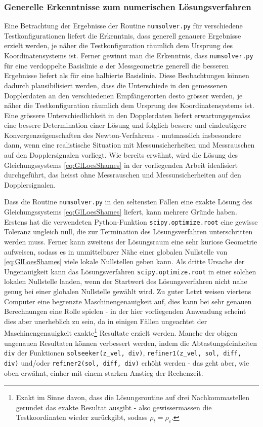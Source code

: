 \documentclass[a4paper,12pt]{article}
\numberwithin{equation}{section}
\begin{document}
\subsubsection{Generelle Erkenntnisse zum numerischen Lösungsverfahren}
Eine Betrachtung der Ergebnisse der Routine \verb|numsolver.py| für verschiedene Testkonfigurationen liefert die Erkenntnis, dass generell genauere Ergebnisse erzielt werden, je näher die Testkonfiguration räumlich dem Ursprung des Koordinatensystems ist. Ferner gewinnt man die Erkenntnis, dass \verb|numsolver.py| für eine verdoppelte Basislinie $a$ der Messgeometrie generell die besseren Ergebnisse liefert als für eine halbierte Basislinie. Diese Beobachtungen können dadurch plausibilisiert werden, dass die Unterschiede in den gemessenen Dopplerdaten an den verschiedenen Empfängerorten desto grösser werden, je näher die Testkonfiguration räumlich dem Ursprung des Koordinatensystems ist. Eine grössere Unterschiedlichkeit in den Dopplerdaten liefert erwartungsgemäss eine bessere Determination einer Lösung und folglich bessere und eindeutigere Konvergenzeigenschaften des Newton-Verfahrens - mutmasslich insbesondere dann, wenn eine realistische Situation mit Messunsicherheiten und Messrauschen auf den Dopplersignalen vorliegt. Wie bereits erwähnt, wird die Lösung des Gleichungssystems \eqref{eq:GlLoesShames} in der vorliegenden Arbeit idealisiert durchgeführt, das heisst ohne Messrauschen und Messunsicherheiten auf den Dopplersignalen. 

Dass die Routine \verb|numsolver.py| in den seltensten Fällen eine exakte Lösung des Gleichungssystems \eqref{eq:GlLoesShames} liefert, kann mehrere Gründe haben. Erstens hat die verwendeten Python-Funktion \verb|scipy.optimize.root| eine gewisse Toleranz ungleich null, die zur Termination des Lösungsverfahren unterschritten werden muss. Ferner kann zweitens der Lösungsraum eine sehr kuriose Geometrie aufweisen, sodass es in unmittelbarer Nähe einer globalen Nullstelle von \eqref{eq:GlLoesShames} viele lokale Nullstellen geben kann. Als dritte Ursache der Ungenauigkeit kann das Lösungsverfahren \verb|scipy.optimize.root| in einer solchen lokalen Nullstelle landen, wenn der Startwert des Lösungsverfahren nicht nahe genug bei einer globalen Nullstelle gewählt wird. Zu guter Letzt weisen viertens Computer eine begrenzte Maschinengenauigkeit auf, dies kann bei sehr genauen Berechnungen eine Rolle spielen - in der hier vorliegenden Anwendung scheint dies aber unerheblich zu sein, da in einigen Fällen ungeachtet der Maschinengenauigkeit exakte\footnote{Exakt im Sinne davon, dass die Lösungsroutine auf drei Nachkommastellen gerundet das exakte Resultat ausgibt - also gewissermassen die Testkoordinaten wieder zurückgibt, sodass $\rho_t = \rho_c$.} Resultate erzielt werden. Manche der obigen ungenauen Resultaten können verbessert werden, indem die Abtastungsfeinheiten \verb|div| der Funktionen \verb|solseeker(z_vel, div)|, \verb|refiner1(z_vel, sol, diff, div)| und/oder \verb|refiner2(sol, diff, div)| erhöht werden - das geht aber, wie oben erwähnt, einher mit einem starken Anstieg der Rechenzeit.
\end{document}
